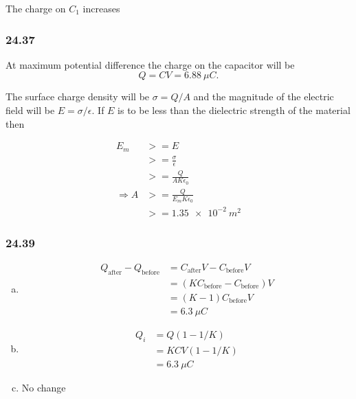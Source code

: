 \documentclass{article}
\begin{document}
The charge on $C_1$ increases

\subsubsection{24.37}

At maximum potential difference the charge on the capacitor will be \[Q = C V = \qty{6.88}{\mu C}.\]

The surface charge density will be $\sigma = Q / A$ and the magnitude of the electric field will be $E = \sigma / \epsilon$. If $E$ is to be less than the dielectric strength of the material then

\begin{align*}
  E_m           & >= E                          \\
                & >= \frac{\sigma}{\epsilon}    \\
                & >= \frac{Q}{A K \epsilon_0}   \\
  \Rightarrow A & >= \frac{Q}{E_m K \epsilon_0} \\
                & >= \qty{1.35e-2}{m^2}
\end{align*}

\subsubsection{24.39}

\begin{enumerate}[(a)]
  \item

        \begin{align*}
          Q_\textrm{after} - Q_\textrm{before} & = C_\textrm{after} V - C_\textrm{before} V    \\
                                               & = (K C_\textrm{before} - C_\textrm{before}) V \\
                                               & = (K - 1) C_\textrm{before} V                 \\
                                               & = \qty{6.3}{\mu C}
        \end{align*}

  \item

        \begin{align*}
          Q_i & = Q (1 - 1 / K)     \\
              & = K C V (1 - 1 / K) \\
              & = \qty{6.3}{\mu C}
        \end{align*}

  \item No change
\end{enumerate}
\end{document}
